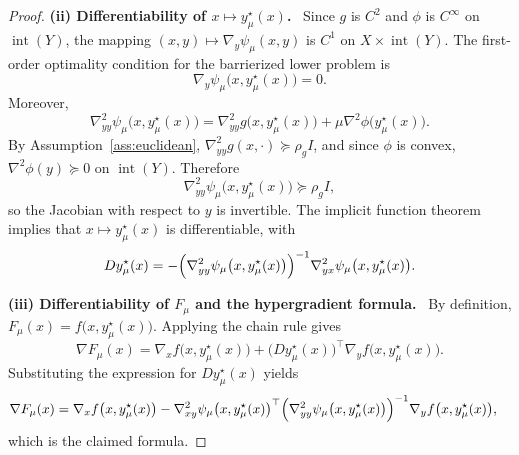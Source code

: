 \documentclass{article}
\newcommand{\proofstep}[1]{\par\smallskip\noindent\textbf{#1}\ }
\begin{document}
\begin{proof}
\proofstep{(ii) Differentiability of \(x\mapsto y_\mu^\star(x)\).}
Since \(g\) is \(C^2\) and \(\phi\) is \(C^\infty\) on \(\operatorname{int}(Y)\), the mapping
\((x,y)\mapsto \nabla_y\psi_\mu(x,y)\) is \(C^1\) on \(X\times\operatorname{int}(Y)\). The
first-order optimality condition for the barrierized lower problem is
\begin{equation*}
\nabla_y\psi_\mu\bigl(x,y_\mu^\star(x)\bigr)=0.
\end{equation*}
Moreover,
\begin{equation*}
\nabla_{yy}^2\psi_\mu\bigl(x,y_\mu^\star(x)\bigr)
=
\nabla_{yy}^2g\bigl(x,y_\mu^\star(x)\bigr)
+
\mu\nabla^2\phi\bigl(y_\mu^\star(x)\bigr).
\end{equation*}
By Assumption~\ref{ass:euclidean}, \(\nabla_{yy}^2g(x,\cdot)\succeq \rho_g I\), and since
\(\phi\) is convex, \(\nabla^2\phi(y)\succeq0\) on \(\operatorname{int}(Y)\). Therefore
\begin{equation*}
\nabla_{yy}^2\psi_\mu\bigl(x,y_\mu^\star(x)\bigr)\succeq \rho_g I,
\end{equation*}
so the Jacobian with respect to \(y\) is invertible. The implicit function theorem implies that
\(x\mapsto y_\mu^\star(x)\) is differentiable, with
\begin{equation*}
D y_\mu^\star(x)
=
-
\Bigl(\nabla_{yy}^2\psi_\mu\bigl(x,y_\mu^\star(x)\bigr)\Bigr)^{-1}
\nabla_{yx}^2\psi_\mu\bigl(x,y_\mu^\star(x)\bigr).
\end{equation*}

\proofstep{(iii) Differentiability of \(F_\mu\) and the hypergradient formula.}
By definition, \(F_\mu(x)=f\bigl(x,y_\mu^\star(x)\bigr)\). Applying the chain rule gives
\begin{equation*}
\nabla F_\mu(x)
=
\nabla_x f\bigl(x,y_\mu^\star(x)\bigr)
+
\bigl(Dy_\mu^\star(x)\bigr)^\top
\nabla_y f\bigl(x,y_\mu^\star(x)\bigr).
\end{equation*}
Substituting the expression for \(D y_\mu^\star(x)\) yields
\begin{align*}
\nabla F_\mu(x)
&=
\nabla_x f\bigl(x,y_\mu^\star(x)\bigr)
-
\nabla_{xy}^2\psi_\mu\bigl(x,y_\mu^\star(x)\bigr)^\top
\Bigl(\nabla_{yy}^2\psi_\mu\bigl(x,y_\mu^\star(x)\bigr)\Bigr)^{-1}
\nabla_y f\bigl(x,y_\mu^\star(x)\bigr),
\end{align*}
which is the claimed formula.


\end{proof}
\end{document}
